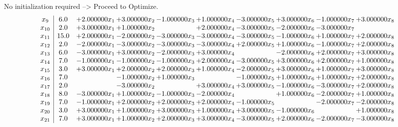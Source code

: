 \documentclass[10pt]{article}
\begin{document}
No initialization required --> Proceed to Optimize. 
\[\begin{array}{c| c c@{\hskip 2pt} c@{\hskip 2pt} c@{\hskip 2pt} c@{\hskip 2pt} c@{\hskip 2pt} c@{\hskip 2pt} c@{\hskip 2pt} c@{\hskip 2pt} }
 x_{9}   &  6.0 & + 2.000000 x_{1} & + 3.000000 x_{2} & -1.000000 x_{3} & + 1.000000 x_{4} & -3.000000 x_{5} & + 3.000000 x_{6} & -1.000000 x_{7} & + 3.000000 x_{8}\\
 x_{10}   &  2.0 & + 3.000000 x_{1} & + 1.000000 x_{2} &   & + 2.000000 x_{4} & -3.000000 x_{5} & -2.000000 x_{6} & -3.000000 x_{7} &   \\
 x_{11}   &  15.0 & + 2.000000 x_{1} & -2.000000 x_{2} & -3.000000 x_{3} & -3.000000 x_{4} & -3.000000 x_{5} & -1.000000 x_{6} & + 1.000000 x_{7} & + 2.000000 x_{8}\\
 x_{12}   &  2.0 & -2.000000 x_{1} & -3.000000 x_{2} & -3.000000 x_{3} & -3.000000 x_{4} & + 2.000000 x_{5} & + 1.000000 x_{6} & -1.000000 x_{7} & + 2.000000 x_{8}\\
 x_{13}   &  6.0 & -3.000000 x_{1} & + 3.000000 x_{2} & -2.000000 x_{3} & + 3.000000 x_{4} &   & -2.000000 x_{6} & + 2.000000 x_{7} & + 3.000000 x_{8}\\
 x_{14}   &  7.0 & -1.000000 x_{1} & -1.000000 x_{2} & -1.000000 x_{3} & + 2.000000 x_{4} & -3.000000 x_{5} & + 3.000000 x_{6} & + 2.000000 x_{7} & + 1.000000 x_{8}\\
 x_{15}   &  3.0 & + 3.000000 x_{1} & + 2.000000 x_{2} & + 2.000000 x_{3} & + 1.000000 x_{4} & -2.000000 x_{5} & + 3.000000 x_{6} & + 1.000000 x_{7} & + 3.000000 x_{8}\\
 x_{16}   &  7.0  &   & -1.000000 x_{2} & + 1.000000 x_{3} &   & -1.000000 x_{5} & + 1.000000 x_{6} & + 1.000000 x_{7} & + 2.000000 x_{8}\\
 x_{17}   &  2.0  &   & -3.000000 x_{2} &   & + 3.000000 x_{4} & + 3.000000 x_{5} & -1.000000 x_{6} & -3.000000 x_{7} & + 2.000000 x_{8}\\
 x_{18}   &  8.0 & -3.000000 x_{1} & + 1.000000 x_{2} & -1.000000 x_{3} & -2.000000 x_{4} &   & + 1.000000 x_{6} & -2.000000 x_{7} & + 1.000000 x_{8}\\
 x_{19}   &  7.0 & -1.000000 x_{1} & + 2.000000 x_{2} & + 2.000000 x_{3} & + 2.000000 x_{4} & -1.000000 x_{5} &   & -2.000000 x_{7} & -2.000000 x_{8}\\
 x_{20}   &  3.0 & + 3.000000 x_{1} & + 1.000000 x_{2} & + 3.000000 x_{3} & + 1.000000 x_{4} & + 3.000000 x_{5} & -1.000000 x_{6} &   & + 1.000000 x_{8}\\
 x_{21}   &  7.0 & + 3.000000 x_{1} & + 1.000000 x_{2} & + 2.000000 x_{3} & + 3.000000 x_{4} & -3.000000 x_{5} & + 2.000000 x_{6} & -2.000000 x_{7} & -3.000000 x_{8}\\

\end{array}\]
\end{document}
